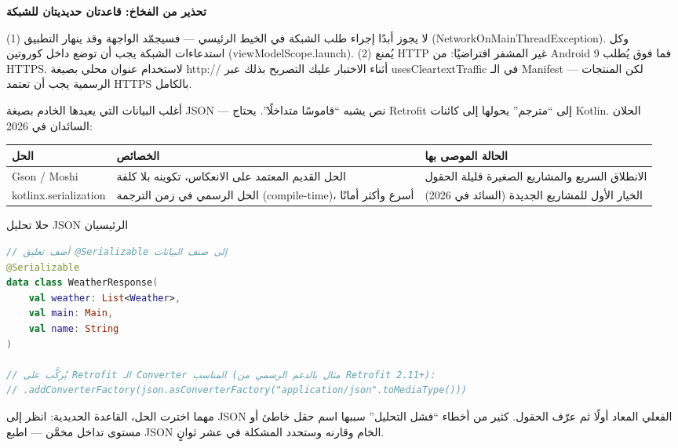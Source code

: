 \textbf{تحذير من الفخاخ: قاعدتان حديديتان للشبكة}\par

(1) لا يجوز أبدًا إجراء طلب الشبكة في الخيط الرئيسي — فسيجمّد الواجهة وقد ينهار التطبيق (NetworkOnMainThreadException). وكل استدعاءات الشبكة يجب أن توضع داخل كوروتين (viewModelScope.launch). (2) يُمنع HTTP غير المشفر افتراضيًا: من Android 9 فما فوق يُطلب HTTPS. لاستخدام عنوان محلي بصيغة http:// أثناء الاختبار عليك التصريح بذلك عبر usesCleartextTraffic في الـ Manifest — لكن المنتجات الرسمية يجب أن تعتمد HTTPS بالكامل.


أغلب البيانات التي يعيدها الخادم بصيغة JSON — نص يشبه “قاموسًا متداخلًا”. يحتاج Retrofit إلى “مترجم” يحولها إلى كائنات Kotlin. الحلان السائدان في 2026:

\begin{center}
\begin{tabularx}{\linewidth}{|X|X|X|}
\hline
\textbf{الحل} & \textbf{الخصائص} & \textbf{الحالة الموصى بها} \tabularnewline
\hline
Gson / Moshi & الحل القديم المعتمد على الانعكاس، تكوينه بلا كلفة & الانطلاق السريع والمشاريع الصغيرة قليلة الحقول \tabularnewline
kotlinx.serialization & الحل الرسمي في زمن الترجمة (compile-time)، أسرع وأكثر أمانًا & الخيار الأول للمشاريع الجديدة (السائد في 2026) \tabularnewline
\hline
\end{tabularx}
\end{center}

\begin{center}\small\color{gray}حلا تحليل JSON الرئيسيان\end{center}

\begin{lstlisting}[language=Kotlin]
// أضف تعليق @Serializable إلى صنف البيانات
@Serializable
data class WeatherResponse(
    val weather: List<Weather>,
    val main: Main,
    val name: String
)

// يُركَّب على Retrofit الـ Converter المناسب (مثال بالدعم الرسمي من Retrofit 2.11+):
// .addConverterFactory(json.asConverterFactory("application/json".toMediaType()))
\end{lstlisting}

مهما اخترت الحل، القاعدة الحديدية: انظر إلى JSON الفعلي المعاد أولًا ثم عرّف الحقول. كثير من أخطاء “فشل التحليل” سببها اسم حقل خاطئ أو مستوى تداخل مخمَّن — اطبع JSON الخام وقارنه وستحدد المشكلة في عشر ثوانٍ.



